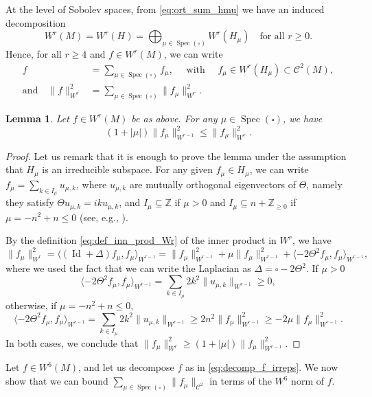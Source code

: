 \documentclass[10pt]{amsart}
\newcommand \Z{\mathbb{Z}}
\DeclareMathOperator{\Spec}{Spec}
\DeclareMathOperator{\Id}{Id}
\newtheorem {lemma}[theorem]{Lemma}
\theoremstyle{definition}
\begin{document}
At the level of Sobolev spaces, from \eqref{eq:ort_sum_hmu} we have an induced decomposition
\[
W^r(M) = W^r(H) = \bigoplus_{\mu \in \Spec(\square)} W^r(H_{\mu}) \quad \text{for all $r \geq 0$}.
\]
Hence, for all $r \geq 4$ and $f \in W^r(M)$, we can write
\begin{equation}\label{eq:decomp_f_irreps}
\begin{split}
f &= \sum_{\mu \in \Spec(\square)} f_\mu, \quad \text{ with } \quad f_\mu \in W^r(H_{\mu}) \subset \mathscr{C}^2(M), \\
\text{and} \quad \|f\|^2_{W^r} &= \sum_{\mu \in \Spec(\square)} \|f_\mu\|^2_{W^r}.
\end{split}
\end{equation}

\begin{lemma}\label{lemma:w4_to_w6}
Let $f \in W^r(M)$ be as above. For any $\mu \in \Spec(\square)$, we have
\[
(1+|\mu|) \|f_\mu\|^2_{W^{r-1}} \leq \|f_\mu\|^2_{W^r}.
\]
\end{lemma}
\begin{proof}
Let us remark that it is enough to prove the lemma under the assumption that $H_\mu$ is an irreducible subspace.
For any given $f_\mu \in H_\mu$, we can write $f_\mu = \sum_{k \in I_\mu} u_{\mu, k}$, where $u_{\mu, k}$ are mutually orthogonal eigenvectors of $\Theta$, namely they satisfy $\Theta u_{\mu, k} = iku_{\mu, k}$, and $I_\mu \subseteq \Z$ if $\mu >0$ and $I_\mu \subseteq n+ \Z_{\geq 0}$ if $\mu = -n^2+n \leq 0$ (see, e.g., \cite[\S2]{FlaFo}).

By the definition \eqref{eq:def_inn_prod_Wr} of the inner product in $W^r$, we have
\[
\|f_\mu\|^2_{W^r} = \langle (\Id+\Delta) f_\mu, f_\mu \rangle_{W^{r-1}} = \|f_\mu\|^2_{W^{r-1}} + \mu \|f_\mu\|^2_{W^{r-1}} + \langle -2\Theta^2 f_\mu, f_\mu \rangle_{W^{r-1}},
\]
where we used the fact that we can write the Laplacian as $\Delta = \square - 2 \Theta^2$.
If $\mu >0$
\[
\langle -2\Theta^2 f_\mu, f_\mu \rangle_{W^{r-1}} = \sum_{k \in I_\mu} 2k^2 \|u_{\mu, k}\|_{W^{r-1}} \geq 0,
\]
otherwise, if $\mu = -n^2+n \leq 0$,
\[
\langle -2\Theta^2 f_\mu, f_\mu \rangle_{W^{r-1}} = \sum_{k \in I_\mu} 2k^2 \|u_{\mu, k}\|_{W^{r-1}} \geq 2n^2 \|f_\mu\|^2_{W^{r-1}}\geq -2\mu \|f_\mu\|^2_{W^{r-1}}.
\]
In both cases, we conclude that $\|f_\mu\|^2_{W^r} \geq (1+|\mu|)\|f_\mu\|^2_{W^{r-1}}$.
\end{proof}

Let $f \in W^6(M)$, and let us decompose $f$ as in \eqref{eq:decomp_f_irreps}. We now show that we can bound $\sum_{\mu \in \Spec(\square)} \|f_\mu\|_{\mathscr{C}^2}$ in terms of the $W^6$ norm of $f$.
\end{document}

